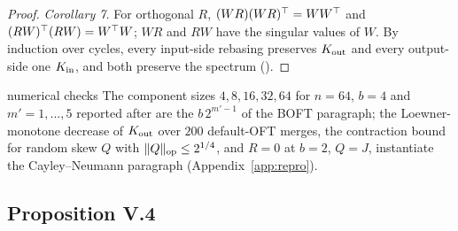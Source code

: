 \begin{proof}
\emph{Corollary 7.} For orthogonal $R$, $(WR)(WR)^{\top}=WW^{\top}$ and $(RW)^{\top}(RW)=W^{\top} W$; $WR$ and $RW$ have the singular values of $W$.
By induction over cycles, every input-side rebasing preserves $K_{\rm out}$ and every output-side one $K_{\rm in}$, and both
preserve the spectrum ().
\end{proof}

\begin{remark*}{numerical checks}
The component sizes $4,8,16,32,64$ for $n=64$, $b=4$ and $m'=1,\dots,5$ reported after  are the
$b\,2^{m'-1}$ of the BOFT paragraph; the Loewner-monotone decrease of $K_{\rm out}$ over $200$ default-OFT merges, the
contraction bound for random skew $Q$ with $\lVert Q\rVert_{\rm op}\le2^{1/4}$, and $R=0$ at $b=2$, $Q=J$, instantiate the
Cayley--Neumann paragraph (Appendix~\ref{app:repro}).
\end{remark*}

\subsection{Proposition V.4}\label{proof:V.4}

